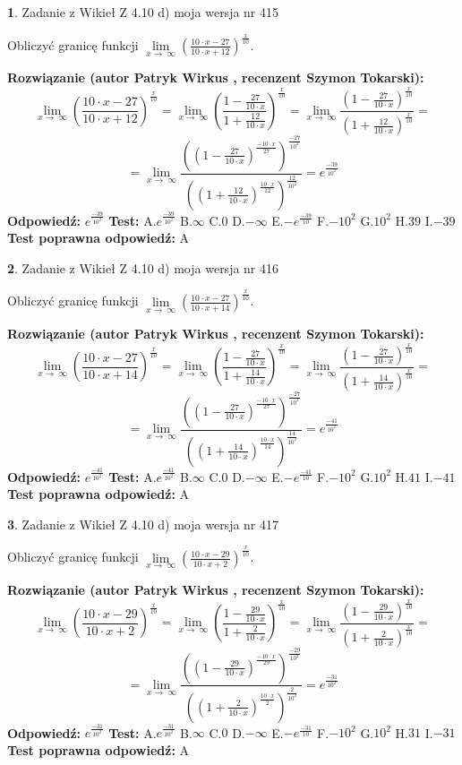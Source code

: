 \documentclass[12pt, a4paper]{article}
\theoremstyle{definition} %
\newtheorem{zad}{}
\newcommand{\zadStart}[1]{\begin{zad}#1\newline}
\newcommand{\zadStop}{\end{zad}}
\newcommand{\rozwStart}[2]{\noindent \textbf{Rozwiązanie (autor #1 , recenzent #2): }\newline}
\newcommand{\rozwStop}{\newline}
\newcommand{\odpStart}{\noindent \textbf{Odpowiedź:}\newline}
\newcommand{\odpStop}{\newline}
\newcommand{\testStart}{\noindent \textbf{Test:}\newline}
\newcommand{\testStop}{\newline}
\newcommand{\kluczStart}{\noindent \textbf{Test poprawna odpowiedź:}\newline}
\newcommand{\kluczStop}{\newline}
\begin{document}
\zadStart{Zadanie z Wikieł Z 4.10 d) moja wersja nr 415}


Obliczyć granicę funkcji  $\lim\limits_{x\to\ \infty}(\frac{10\cdot x-27}{10\cdot x+12})^{\frac{x}{10}}$.
\zadStop
\rozwStart{Patryk Wirkus}{Szymon Tokarski}
$$\lim\limits_{x\to\ \infty}(\frac{10\cdot x-27}{10\cdot x+12})^{\frac{x}{10}} = \lim\limits_{x\to\ \infty}(\frac{1-\frac{27}{10\cdot x}}{1+\frac{12}{10\cdot x}})^{\frac{x}{10}}=\lim\limits_{x\to\ \infty}\frac{(1-\frac{27}{10\cdot x})^{\frac{x}{10}}}{(1+\frac{12}{10\cdot x})^{\frac{x}{10}}}=$$
$$=\lim\limits_{x\to\ \infty}\frac{((1-\frac{27}{10\cdot x})^{\frac{-10\cdot x}{27}})^{\frac{-27}{10^{2}}}}{((1+\frac{12}{10\cdot x})^{\frac{10\cdot x}{12}})^{\frac{12}{10^{2}}}}=e^{\frac{-39}{10^{2}}}$$
\rozwStop
\odpStart
$e^{\frac{-39}{10^{2}}}$
\odpStop
\testStart
A.$e^{\frac{-39}{10^{2}}}$ B.$\infty$ C.$0$ D.$-\infty$ E.$-e^{\frac{-39}{10}}$
F.$-10^{2}$ G.$10^{2}$
H.$39$
I.$-39$
\testStop
\kluczStart
A
\kluczStop



\zadStart{Zadanie z Wikieł Z 4.10 d) moja wersja nr 416}


Obliczyć granicę funkcji  $\lim\limits_{x\to\ \infty}(\frac{10\cdot x-27}{10\cdot x+14})^{\frac{x}{10}}$.
\zadStop
\rozwStart{Patryk Wirkus}{Szymon Tokarski}
$$\lim\limits_{x\to\ \infty}(\frac{10\cdot x-27}{10\cdot x+14})^{\frac{x}{10}} = \lim\limits_{x\to\ \infty}(\frac{1-\frac{27}{10\cdot x}}{1+\frac{14}{10\cdot x}})^{\frac{x}{10}}=\lim\limits_{x\to\ \infty}\frac{(1-\frac{27}{10\cdot x})^{\frac{x}{10}}}{(1+\frac{14}{10\cdot x})^{\frac{x}{10}}}=$$
$$=\lim\limits_{x\to\ \infty}\frac{((1-\frac{27}{10\cdot x})^{\frac{-10\cdot x}{27}})^{\frac{-27}{10^{2}}}}{((1+\frac{14}{10\cdot x})^{\frac{10\cdot x}{14}})^{\frac{14}{10^{2}}}}=e^{\frac{-41}{10^{2}}}$$
\rozwStop
\odpStart
$e^{\frac{-41}{10^{2}}}$
\odpStop
\testStart
A.$e^{\frac{-41}{10^{2}}}$ B.$\infty$ C.$0$ D.$-\infty$ E.$-e^{\frac{-41}{10}}$
F.$-10^{2}$ G.$10^{2}$
H.$41$
I.$-41$
\testStop
\kluczStart
A
\kluczStop



\zadStart{Zadanie z Wikieł Z 4.10 d) moja wersja nr 417}


Obliczyć granicę funkcji  $\lim\limits_{x\to\ \infty}(\frac{10\cdot x-29}{10\cdot x+2})^{\frac{x}{10}}$.
\zadStop
\rozwStart{Patryk Wirkus}{Szymon Tokarski}
$$\lim\limits_{x\to\ \infty}(\frac{10\cdot x-29}{10\cdot x+2})^{\frac{x}{10}} = \lim\limits_{x\to\ \infty}(\frac{1-\frac{29}{10\cdot x}}{1+\frac{2}{10\cdot x}})^{\frac{x}{10}}=\lim\limits_{x\to\ \infty}\frac{(1-\frac{29}{10\cdot x})^{\frac{x}{10}}}{(1+\frac{2}{10\cdot x})^{\frac{x}{10}}}=$$
$$=\lim\limits_{x\to\ \infty}\frac{((1-\frac{29}{10\cdot x})^{\frac{-10\cdot x}{29}})^{\frac{-29}{10^{2}}}}{((1+\frac{2}{10\cdot x})^{\frac{10\cdot x}{2}})^{\frac{2}{10^{2}}}}=e^{\frac{-31}{10^{2}}}$$
\rozwStop
\odpStart
$e^{\frac{-31}{10^{2}}}$
\odpStop
\testStart
A.$e^{\frac{-31}{10^{2}}}$ B.$\infty$ C.$0$ D.$-\infty$ E.$-e^{\frac{-31}{10}}$
F.$-10^{2}$ G.$10^{2}$
H.$31$
I.$-31$
\testStop
\kluczStart
A
\kluczStop
\end{document}
